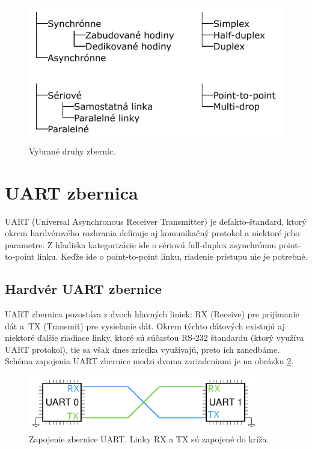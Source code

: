 \begin{figure}
    \centerline{\includegraphics[width=1\textwidth]{images/misc/busTree.pdf}}
    \caption[Vybrané typy zberníc]{Vybrané druhy zberníc.}
    \label{obr:busTree}
\end{figure}

\section{UART zbernica}
UART (Universal Asynchronous Receiver Transmitter) je defakto-štandard, ktorý okrem hardvérového rozhrania definuje aj komunikačný protokol a niektoré jeho parametre. Z hľadiska kategorizácie ide o sériovú full-duplex asynchrónnu point-to-point linku. Keďže ide o point-to-point linku, riadenie prístupu nie je potrebné.

\subsection{Hardvér UART zbernice}
UART zbernica pozostáva z dvoch hlavných liniek: RX (Receive) pre prijímanie dát a~TX (Transmit) pre vysielanie dát. Okrem týchto dátových existujú aj niektoré ďalšie riadiace linky, ktoré sú súčasťou RS-232 štandardu \cite{rs232Spec} (ktorý využíva UART protokol), tie sa však dnes zriedka využívajú, preto ich zanedbáme. Schéma zapojenia UART zbernice medzi dvoma zariadeniami je na obrázku \ref{obr:uartWiring}.

\begin{figure}
    \centerline{\includegraphics[width=0.9\textwidth]{images/busses/uartWiring.pdf}}
    \caption[Zapojenie zbernice UART]{Zapojenie zbernice UART. Linky RX a TX sú zapojené do kríža.}
    \label{obr:uartWiring}
\end{figure}

